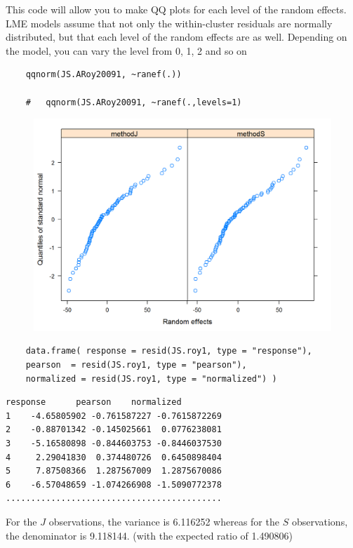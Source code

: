 \documentclass[a4paper,12pt]{article}
\begin{document}
This code will allow you to make QQ plots for each level of the random effects.  LME models assume that not only the within-cluster residuals are normally distributed, but that each level of the random effects are as well. Depending on the model, you can vary the level from 0, 1, 2 and so on
\begin{framed}
	\begin{verbatim}
	qqnorm(JS.ARoy20091, ~ranef(.))
	
	# 	qqnorm(JS.ARoy20091, ~ranef(.,levels=1)
	\end{verbatim}
\end{framed}
\begin{figure}[h!]
	\centering
	\includegraphics[width=0.9\linewidth]{images/ResidPlot2}
	\caption{}
	\label{fig:ResidPlot2}
\end{figure}	


\begin{framed}
	\begin{verbatim}
	data.frame( response = resid(JS.roy1, type = "response"), 
	pearson  = resid(JS.roy1, type = "pearson"), 
	normalized = resid(JS.roy1, type = "normalized") )
	\end{verbatim}
\end{framed}

\begin{verbatim}
response      pearson    normalized
1    -4.65805902 -0.761587227 -0.7615872269
2    -0.88701342 -0.145025661  0.0776238081
3    -5.16580898 -0.844603753 -0.8446037530
4     2.29041830  0.374480726  0.6450898404
5     7.87508366  1.287567009  1.2875670086
6    -6.57048659 -1.074266908 -1.5090772378
...........................................
\end{verbatim}
For the $J$ observations, the variance is 6.116252 whereas for the $S$ observations, the denominator is 9.118144. (with the expected ratio of  1.490806)
\end{document}
